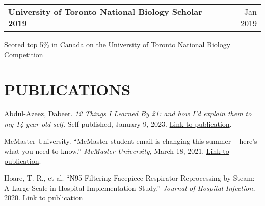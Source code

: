 \documentclass[a4paper,10pt]{article}
\begin{document}
\vspace{6pt}

\begin{tabularx}{\linewidth}{@{}l X r@{}}
\textbf{University of Toronto National Biology Scholar 2019 } & \hfill &     Jan 2019
 \end{tabularx}
Scored top 5\% in Canada on the University of Toronto National Biology Competition


\section{PUBLICATIONS}
Abdul-Azeez, Dabeer. \textit{12 Things I Learned By 21: and how I'd explain them to my 14-year-old self}. Self-published, January 9, 2023. \href{https://a.co/d/1IZYYJJ}{Link to publication}.
\vspace{8pt}

McMaster University. “McMaster student email is changing this summer – here’s what you need to know.” \textit{McMaster University}, March 18, 2021. \href{https://dailynews.mcmaster.ca/worthmentioning/mcmaster-student-email-is-changing-this-summer-heres-what-you-need-to-know/}{Link to publication}.
\vspace{8pt}

Hoare, T. R., et al. “N95 Filtering Facepiece Respirator Reprocessing by Steam: A Large-Scale in-Hospital Implementation Study.” \textit{Journal of Hospital Infection, }2020. \href{https://www.sciencedirect.com/science/article/pii/S0195670120304576#!}{Link to publication}
\end{document}
